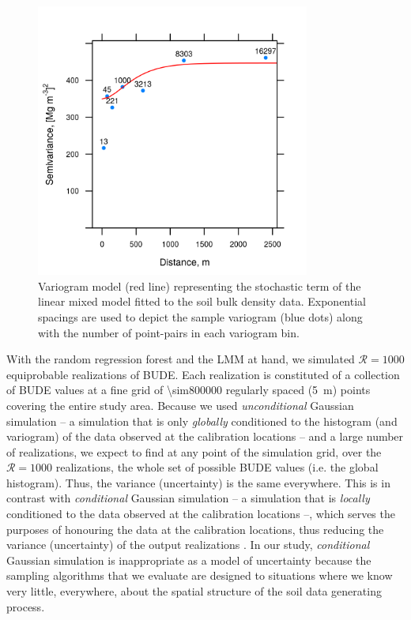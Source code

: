 {\begin{figure}[!ht]
 \centering
 \includegraphics[width=90mm]{fig/chap07-bude-vario}
 \caption[Variogram model representing the stochastic term of the linear mixed model fitted to the soil bulk
 density data.]{Variogram model (red line) representing the stochastic term of the linear mixed model fitted
 to the soil bulk density data. Exponential spacings are used to depict the sample variogram (blue dots) along 
 with  the number of point-pairs in each variogram bin.}
 \label{fig:chap07-bude-vario}
\end{figure}

With the random regression forest and the LMM at hand, we simulated $\mathcal{R} = 1000$ equiprobable 
realizations of BUDE. Each realization is constituted of a collection of BUDE values at a fine grid of 
\num{\sim800000} regularly spaced (\SI{5}{\metre}) points covering the entire study area. Because we used 
\emph{unconditional} Gaussian simulation -- a simulation that is only \emph{globally} conditioned to the 
histogram (and variogram) of the data observed at the calibration locations \cite{Goovaerts1997} -- and a 
large number of realizations, we expect to find at any point of the simulation grid, over the $\mathcal{R} = 
1000$ realizations, the whole set of possible BUDE values (i.e. the global histogram). Thus, the variance
(uncertainty) is the same everywhere. This is in contrast with \emph{conditional} Gaussian simulation -- a 
simulation that is \emph{locally} conditioned to the data observed at the calibration locations --, which 
serves the purposes of honouring the data at the calibration locations, thus reducing the variance 
(uncertainty) of the output realizations \cite{Goovaerts1997}. In our study, \emph{conditional} Gaussian 
simulation is inappropriate as a model of uncertainty because the sampling algorithms that we evaluate are 
designed to situations where we know very little, everywhere, about the spatial structure of the soil data 
generating process.





}
